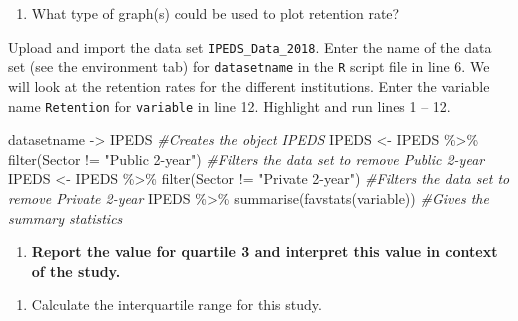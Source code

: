 \documentclass[
]{report}
\newenvironment{Shaded}{\begin{snugshade}}{\end{snugshade}}
\newcommand{\CommentTok}[1]{\textcolor[rgb]{0.56,0.35,0.01}{\textit{#1}}}
\newcommand{\FunctionTok}[1]{\textcolor[rgb]{0.00,0.00,0.00}{#1}}
\newcommand{\NormalTok}[1]{#1}
\newcommand{\OtherTok}[1]{\textcolor[rgb]{0.56,0.35,0.01}{#1}}
\newcommand{\SpecialCharTok}[1]{\textcolor[rgb]{0.00,0.00,0.00}{#1}}
\newcommand{\StringTok}[1]{\textcolor[rgb]{0.31,0.60,0.02}{#1}}
\providecommand{\tightlist}{%
  \setlength{\itemsep}{0pt}\setlength{\parskip}{0pt}}
\begin{document}
\begin{enumerate}
\def\labelenumi{\arabic{enumi}.}
\setcounter{enumi}{3}
\tightlist
\item
  What type of graph(s) could be used to plot retention rate?
\end{enumerate}

\vspace{0.5in}

Upload and import the data set \texttt{IPEDS\_Data\_2018}. Enter the name of the data set (see the environment tab) for \texttt{datasetname} in the \texttt{R} script file in line 6. We will look at the retention rates for the different institutions. Enter the variable name \texttt{Retention} for \texttt{variable} in line 12. Highlight and run lines 1 -- 12.

\begin{Shaded}
\begin{Highlighting}[]
\NormalTok{datasetname }\OtherTok{{-}\textgreater{}}\NormalTok{ IPEDS }\CommentTok{\#Creates the object IPEDS }
\NormalTok{IPEDS }\OtherTok{\textless{}{-}}\NormalTok{ IPEDS }\SpecialCharTok{\%\textgreater{}\%}
  \FunctionTok{filter}\NormalTok{(Sector }\SpecialCharTok{!=} \StringTok{"Public 2{-}year"}\NormalTok{) }\CommentTok{\#Filters the data set to remove Public 2{-}year}
\NormalTok{IPEDS }\OtherTok{\textless{}{-}}\NormalTok{ IPEDS }\SpecialCharTok{\%\textgreater{}\%}
  \FunctionTok{filter}\NormalTok{(Sector }\SpecialCharTok{!=} \StringTok{"Private 2{-}year"}\NormalTok{) }\CommentTok{\#Filters the data set to remove Private 2{-}year}
\NormalTok{IPEDS }\SpecialCharTok{\%\textgreater{}\%}
  \FunctionTok{summarise}\NormalTok{(}\FunctionTok{favstats}\NormalTok{(variable)) }\CommentTok{\#Gives the summary statistics}
\end{Highlighting}
\end{Shaded}

\begin{enumerate}
\def\labelenumi{\arabic{enumi}.}
\setcounter{enumi}{4}
\tightlist
\item
  \textbf{Report the value for quartile 3 and interpret this value in context of the study.}
\end{enumerate}

\vspace{1in}

\begin{enumerate}
\def\labelenumi{\arabic{enumi}.}
\setcounter{enumi}{5}
\tightlist
\item
  Calculate the interquartile range for this study.
\end{enumerate}
\end{document}
